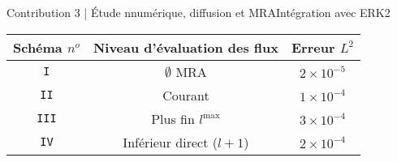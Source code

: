 \begin{frame}{Contribution 3 | Étude nnumérique, diffusion et MRA}{Intégration avec ERK2}
    \begin{center}
        \begin{tabular}
            {|c|c|c|}\hline Schéma $n^o$ & Niveau d'évaluation des flux & Erreur $L^2$ \\\hline\texttt{I} & $\emptyset$ MRA & $2 \times 10^{-5}$ \\\texttt{II} & Courant & $1 \times 10^{-4}$ \\\texttt{III} & Plus fin $l^{\max}$& $3 \times 10^{-4}$ \\\texttt{IV} & Inférieur direct ($l+1$) & $2 \times 10^{-4}$ \\\hline
        \end{tabular}
    \end{center}
\end{frame}